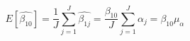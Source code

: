 \begin{equation}
\label{avgest}
E[\hat{\beta_{10}}] = \frac{1}{J}\sum\limits_{j=1}^J{\hat{\beta_{1j}}} = \frac{\beta_{10}}{J}\sum\limits_{j=1}^J{\alpha_j} = \beta_{10}\mu_{\alpha}
\end{equation}
